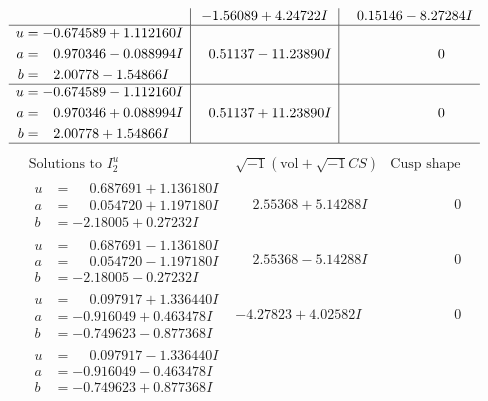 \documentclass[1p]{elsarticle_modified}
\theoremstyle{definition}
\newcommand{\I}{\sqrt{-1}}
\begin{document}
$$\begin{array}{c|c|c}
 & -1.56089 + 4.24722 I & \phantom{-}0.15146 - 8.27284 I \\ \hline\begin{aligned}
u &= -0.674589 + 1.112160 I \\
a &= \phantom{-}0.970346 - 0.088994 I \\
b &= \phantom{-}2.00778 - 1.54866 I\end{aligned}
 & \phantom{-}0.51137 - 11.23890 I & \phantom{-0.000000 } 0 \\ \hline\begin{aligned}
u &= -0.674589 - 1.112160 I \\
a &= \phantom{-}0.970346 + 0.088994 I \\
b &= \phantom{-}2.00778 + 1.54866 I\end{aligned}
 & \phantom{-}0.51137 + 11.23890 I & \phantom{-0.000000 } 0\\
 \hline 
 \end{array}$$\newpage$$\begin{array}{c|c|c}  
\text{Solutions to }I^u_{2}& \I (\text{vol} + \sqrt{-1}CS) & \text{Cusp shape}\\
 \hline 
\begin{aligned}
u &= \phantom{-}0.687691 + 1.136180 I \\
a &= \phantom{-}0.054720 + 1.197180 I \\
b &= -2.18005 + 0.27232 I\end{aligned}
 & \phantom{-}2.55368 + 5.14288 I & \phantom{-0.000000 } 0 \\ \hline\begin{aligned}
u &= \phantom{-}0.687691 - 1.136180 I \\
a &= \phantom{-}0.054720 - 1.197180 I \\
b &= -2.18005 - 0.27232 I\end{aligned}
 & \phantom{-}2.55368 - 5.14288 I & \phantom{-0.000000 } 0 \\ \hline\begin{aligned}
u &= \phantom{-}0.097917 + 1.336440 I \\
a &= -0.916049 + 0.463478 I \\
b &= -0.749623 - 0.877368 I\end{aligned}
 & -4.27823 + 4.02582 I & \phantom{-0.000000 } 0 \\ \hline\begin{aligned}
u &= \phantom{-}0.097917 - 1.336440 I \\
a &= -0.916049 - 0.463478 I \\
b &= -0.749623 + 0.877368 I\end{aligned}

\end{array}$$
\end{document}
